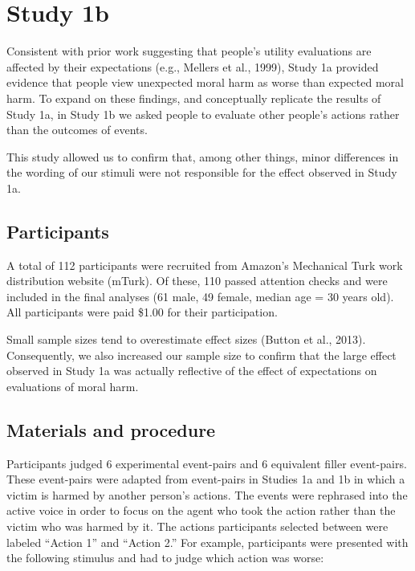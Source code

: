 \documentclass[10pt, letterpaper]{article}
\begin{document}
\section{Study 1b}\label{study-1b}

Consistent with prior work suggesting that people's utility evaluations
are affected by their expectations (e.g., Mellers et al., 1999), Study
1a provided evidence that people view unexpected moral harm as worse
than expected moral harm. To expand on these findings, and conceptually
replicate the results of Study 1a, in Study 1b we asked people to
evaluate other people's actions rather than the outcomes of events.

This study allowed us to confirm that, among other things, minor
differences in the wording of our stimuli were not responsible for the
effect observed in Study 1a.

\subsection{Participants}\label{participants-1}

A total of 112 participants were recruited from Amazon's Mechanical Turk
work distribution website (mTurk). Of these, 110 passed attention checks
and were included in the final analyses (61 male, 49 female, median age
= 30 years old). All participants were paid \$1.00 for their
participation.

Small sample sizes tend to overestimate effect sizes (Button et al.,
2013). Consequently, we also increased our sample size to confirm that
the large effect observed in Study 1a was actually reflective of the
effect of expectations on evaluations of moral harm.

\subsection{Materials and procedure}\label{materials-and-procedure-1}

Participants judged 6 experimental event-pairs and 6 equivalent filler
event-pairs. These event-pairs were adapted from event-pairs in Studies
1a and 1b in which a victim is harmed by another person's actions. The
events were rephrased into the active voice in order to focus on the
agent who took the action rather than the victim who was harmed by it.
The actions participants selected between were labeled ``Action 1'' and
``Action 2.'' For example, participants were presented with the
following stimulus and had to judge which action was worse:
\end{document}
